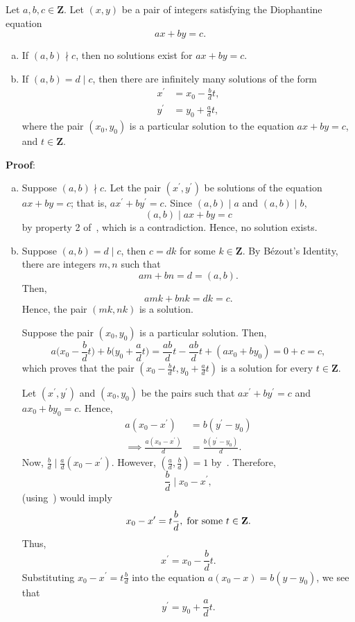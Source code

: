 \begin{Theorem}{}{}
    Let $ a,b,c\in\mathbf{Z} $. Let $ (x,y) $ be a pair of integers satisfying the Diophantine equation
    \[ ax+by=c. \]
    \begin{enumerate}[(a)]
        \item If $ (a,b)\nmid c $, then no solutions exist for $ ax+by=c $.
        \item If $ (a,b)=d\mid c $, then there are infinitely many solutions of the form
              \begin{align*}
                  x^\prime & =x_0-\frac{b}{d}t, \\
                  y^\prime & =y_0+\frac{a}{d}t,
              \end{align*}
              where the pair $ (x_0,y_0) $ is a particular solution to the equation $ ax+by=c $,
              and $ t\in\mathbf{Z} $.
    \end{enumerate}
    \tcblower{}
    \textbf{Proof}:
    \begin{enumerate}[(a)]
        \item Suppose $ (a,b)\nmid c $. Let the pair $ (x^\prime,y^\prime) $ be solutions of the equation
              $ ax+by=c $; that is, $ ax^\prime+by^\prime=c $. Since $ (a,b)\mid a $ and $ (a,b)\mid b $,
              \[ (a,b)\mid ax+by=c \]
              by property 2 of~, which is a contradiction. Hence, no solution exists.
        \item Suppose $ (a,b)=d\mid c $, then $ c=dk $ for some $ k\in\mathbf{Z} $. By Bézout's Identity,
              there are integers $ m,n $ such that
              \[ am+bn=d=(a,b). \]
              Then,
              \[ amk+bnk=dk=c. \]
              Hence, the pair $(mk, nk)$ is a solution.

              Suppose the pair $ (x_0,y_0) $ is a particular solution. Then,
              \[ a\biggl(x_0-\frac{b}{d}t\biggr)+b\biggl(y_0+\frac{a}{d}t\biggr)=\frac{ab}{d}t-\frac{ab}{d}t+(ax_0+by_0)=0+c=c, \]
              which proves that the pair $ (x_0-\frac{b}{d}t,y_0+\frac{a}{d}t) $ is a solution for every $ t\in\mathbf{Z} $.

              Let $ (x^\prime,y^\prime) $ and $ (x_0,y_0) $ be the pairs such that $ ax^\prime+by^\prime=c $ and $ ax_0+by_0=c $. Hence,
              \begin{align*}
                  a(x_0-x^\prime)                    & =b(y^\prime-y_0)            \\
                  \implies \frac{a(x_0-x^\prime)}{d} & =\frac{b(y^\prime-y_0)}{d}.
              \end{align*}
              Now, $ \frac{b}{d}\mid \frac{a}{d}(x_0-x^\prime) $. However, $ (\frac{a}{d},\frac{b}{d})=1 $ by~. Therefore,
              \[ \frac{b}{d}\mid x_0-x^\prime, \]
              (using~) would imply
              \[ x_0-x^\prime=t \frac{b}{d},\; \text{for some $ t\in\mathbf{Z} $}. \]
              Thus,
              \[ x^\prime=x_0-\frac{b}{d}t. \]
              Substituting $ x_0-x^\prime=t \frac{b}{d} $ into the equation $ a(x_0-x)=b(y-y_0) $, we see that
              \[ y^\prime=y_0+\frac{a}{d}t. \]
    \end{enumerate}
\end{Theorem}
